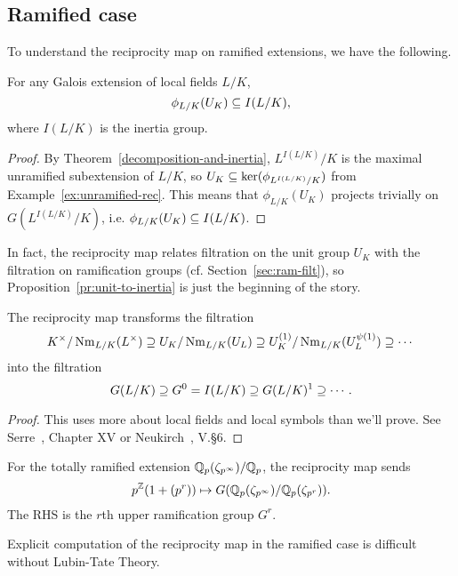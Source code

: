 \subsection{Ramified case}
To understand the reciprocity map on ramified extensions, we have the following.
\begin{pr}
For any Galois extension of local fields $L/K$, 
\[\phi_{L/K}(U_K)\subseteq I(L/K),\]
where $I(L/K)$ is the inertia group.
\end{pr}
\begin{proof}
By Theorem~\ref{decomposition-and-inertia}, $L^{I(L/K)}/K$ is the maximal unramified subextension of $L/K$,  so $U_K\subseteq \ker(\phi_{L^{I(L/K)}/K})$ from Example~\ref{ex:unramified-rec}. This means that $\phi_{L/K}(U_K)$ projects trivially on $G(L^{I(L/K)}/K)$, i.e. $\phi_{L/K}(U_K)\subseteq I(L/K)$.
\end{proof}
In fact, the reciprocity map relates filtration on the unit group $U_K$ with the filtration on ramification groups (cf. Section~\ref{sec:ram-filt}), so Proposition~\ref{pr:unit-to-inertia} is just the beginning of the story.
\begin{thm}
The reciprocity map transforms the filtration
\[
K^{\times}/\operatorname{Nm}_{L/K}(L^{\times})\supseteq U_K/\operatorname{Nm}_{L/K}(U_L)\supseteq U_K^{(1)}/\operatorname{Nm}_{L/K}(U_L^{\psi(1)})\supseteq \cdots
\]
into the filtration
\[
G(L/K)\supseteq G^0=I(L/K)\supseteq G(L/K)^1\supseteq \cdots.
\]
\end{thm}
\begin{proof}
This uses more about local fields and local symbols than we'll prove. See Serre~\cite{Se79}, Chapter XV or Neukirch~\cite{Ne99}, V.\S6.
\end{proof}
\begin{ex}
For the totally ramified extension $\mathbb{Q}_p(\zeta_{p^{\infty}})/\mathbb{Q}_p$, the reciprocity map sends
\[
p^{\mathbb{Z}}(1+(p^r))\mapsto G(\mathbb{Q}_p(\zeta_{p^{\infty}})/\mathbb{Q}_p(\zeta_{p^r})).
\]
The RHS is the $r$th upper ramification group $G^r$.
\end{ex}
Explicit computation of the reciprocity map in the ramified case is difficult without Lubin-Tate Theory.
